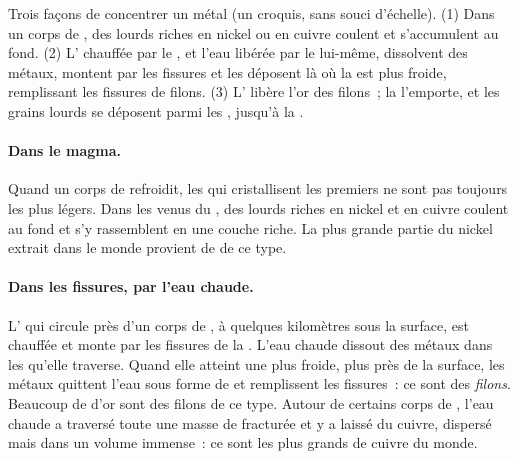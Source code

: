 \begin{omfigure}
{\small Trois façons de concentrer un métal (un croquis, sans souci
d'échelle). (1) Dans un corps de , des  lourds riches en
nickel ou en cuivre coulent et s'accumulent au fond. (2) L'
chauffée par le , et l'eau libérée par le  lui-même, dissolvent
des métaux, montent par les fissures et les déposent là où la  est
plus froide, remplissant les fissures de filons. (3) L' libère l'or
des filons~; la  l'emporte, et les grains lourds se déposent parmi
les , jusqu'à la .}
\label{fig:g9:earth-resources:deposits}
\end{omfigure}

\paragraph{Dans le magma.} Quand un corps de  refroidit, les 
qui cristallisent les premiers ne sont pas toujours les plus légers. Dans
les  venus du , des  lourds riches en nickel et en
cuivre coulent au fond et s'y rassemblent en une couche riche. La plus
grande partie du nickel extrait dans le monde provient de  de ce
type.

\paragraph{Dans les fissures, par l'eau chaude.} L' qui
circule près d'un corps de , à quelques kilomètres sous la surface,
est chauffée et monte par les fissures de la . L'eau chaude dissout
des métaux dans les  qu'elle traverse. Quand elle atteint une 
plus froide, plus près de la surface, les métaux quittent l'eau sous forme
de  et remplissent les fissures~: ce sont des
\emph{filons}. Beaucoup de  d'or sont des filons de
ce type. Autour de certains corps de , l'eau chaude a traversé toute
une masse de  fracturée et y a laissé du cuivre, dispersé mais dans
un volume immense~: ce sont les plus grands  de cuivre du monde.


